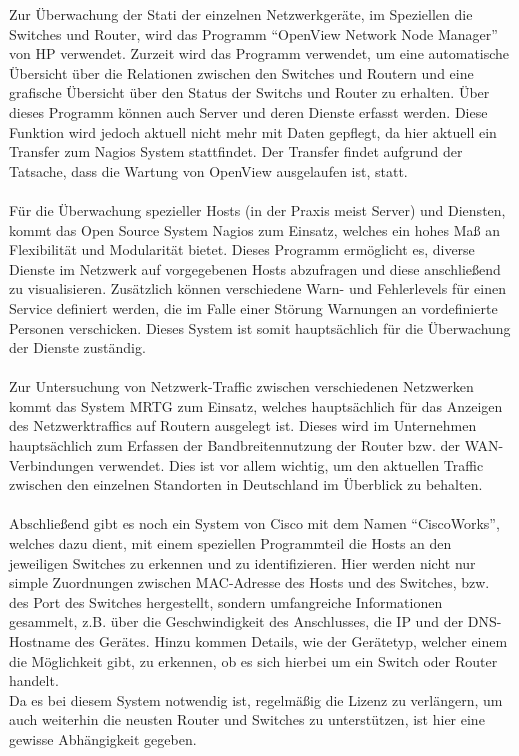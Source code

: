 Zur Überwachung der Stati der einzelnen Netzwerkgeräte, im Speziellen die Switches und Router, wird das Programm “OpenView Network Node Manager” von HP verwendet.
Zurzeit wird das Programm verwendet, um eine automatische Übersicht über die Relationen zwischen den Switches und Routern und eine grafische Übersicht über den Status der Switchs und Router zu erhalten.
Über dieses Programm können auch Server und deren Dienste erfasst werden.
Diese Funktion wird jedoch aktuell nicht mehr mit Daten gepflegt, da hier aktuell ein Transfer zum Nagios System stattfindet. Der Transfer findet aufgrund der Tatsache, dass die Wartung von OpenView ausgelaufen ist, statt.\\\\
Für die Überwachung spezieller Hosts (in der Praxis meist Server) und Diensten, kommt das Open Source System Nagios zum Einsatz, welches ein hohes Maß an Flexibilität und Modularität bietet.
Dieses Programm ermöglicht es, diverse Dienste im Netzwerk auf vorgegebenen Hosts abzufragen und diese anschließend zu visualisieren.
Zusätzlich können verschiedene Warn- und Fehlerlevels für einen Service definiert werden, die im Falle einer Störung Warnungen an vordefinierte Personen verschicken.
Dieses System ist somit hauptsächlich für die Überwachung der Dienste zuständig.\\\\
Zur Untersuchung von Netzwerk-Traffic zwischen verschiedenen Netzwerken kommt das System MRTG zum Einsatz, welches hauptsächlich für das Anzeigen des Netzwerktraffics auf Routern ausgelegt ist.
Dieses wird im Unternehmen hauptsächlich zum Erfassen der Bandbreitennutzung der Router bzw. der WAN-Verbindungen verwendet.
Dies ist vor allem wichtig, um den aktuellen Traffic zwischen den einzelnen Standorten in Deutschland im Überblick zu behalten.\\\\
Abschließend gibt es noch ein System von Cisco mit dem Namen “CiscoWorks”, welches dazu dient, mit einem speziellen Programmteil die Hosts an den jeweiligen Switches zu erkennen und zu identifizieren.
Hier werden nicht nur simple Zuordnungen zwischen MAC-Adresse des Hosts und des Switches, bzw. des Port des Switches hergestellt,
sondern umfangreiche Informationen gesammelt, z.B. über die Geschwindigkeit des Anschlusses, die IP und der DNS-Hostname des Gerätes.
Hinzu kommen Details, wie der Gerätetyp, welcher einem die Möglichkeit gibt, zu erkennen, ob es sich hierbei um ein Switch oder Router handelt.\\
Da es bei diesem System notwendig ist, regelmäßig die Lizenz zu verlängern, um auch weiterhin die neusten Router und Switches zu unterstützen, ist hier eine gewisse Abhängigkeit gegeben.
